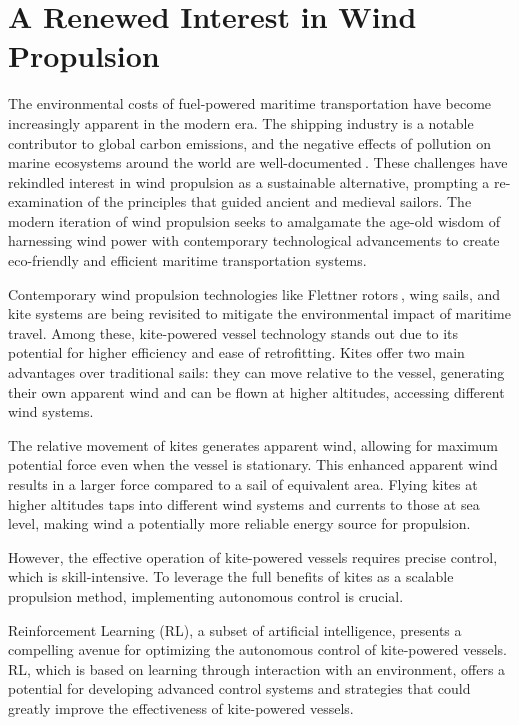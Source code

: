 \section{A Renewed Interest in Wind Propulsion}
The environmental costs of fuel-powered maritime transportation have become increasingly apparent in the modern era. The shipping industry is a notable contributor to global carbon emissions, and the negative effects of pollution on marine ecosystems around the world are well-documented$~$\cite{corbett2007mortality}. These challenges have rekindled interest in wind propulsion as a sustainable alternative, prompting a re-examination of the principles that guided ancient and medieval sailors. The modern iteration of wind propulsion seeks to amalgamate the age-old wisdom of harnessing wind power with contemporary technological advancements to create eco-friendly and efficient maritime transportation systems.

Contemporary wind propulsion technologies like Flettner rotors$~$\cite{vahs2019retrofitting}, wing sails, and kite systems are being revisited to mitigate the environmental impact of maritime travel. Among these, kite-powered vessel technology stands out due to its potential for higher efficiency and ease of retrofitting. Kites offer two main advantages over traditional sails: they can move relative to the vessel, generating their own apparent wind and can be flown at higher altitudes, accessing different wind systems.

The relative movement of kites generates apparent wind, allowing for maximum potential force even when the vessel is stationary. This enhanced apparent wind results in a larger force compared to a sail of equivalent area. Flying kites at higher altitudes taps into different wind systems and currents to those at sea level, making wind a potentially more reliable energy source for propulsion.

However, the effective operation of kite-powered vessels requires precise control, which is skill-intensive. To leverage the full benefits of kites as a scalable propulsion method, implementing autonomous control is crucial. 

Reinforcement Learning (RL), a subset of artificial intelligence, presents a compelling avenue for optimizing the autonomous control of kite-powered vessels. RL, which is based on learning through interaction with an environment, offers a potential for developing advanced control systems and strategies that could greatly improve the effectiveness of kite-powered vessels. 


